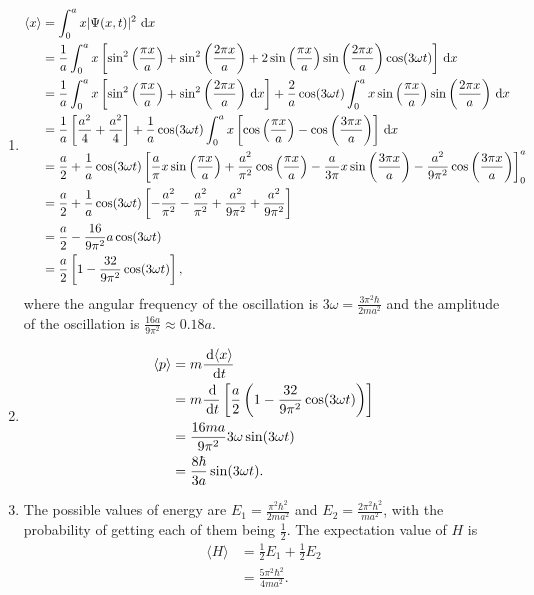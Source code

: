 \documentclass[en, oneside]{vivi}
\begin{document}
\begin{sol}
\begin{enumerate} [label=(\alph*)]
\begin{align*}
        \end{align*}
        \item \begin{align*}
            \langle x \rangle &= \int_{0}^{a}x|\Psi(x, t)|^2 \dif x\\
            &= \frac{1}{a} \int_{0}^{a}x \left[\sin^2\left(\frac{\pi x}{a}\right) + \sin^2\left(\frac{2\pi x}{a}\right) + 2 \sin\left(\frac{\pi x}{a}\right)\sin\left(\frac{2\pi x}{a}\right) \cos(3\omega t)\right] \dif x\\
            &= \frac{1}{a} \int_{0}^{a}x \left[\sin^2\left(\frac{\pi x}{a}\right) + \sin^2\left(\frac{2\pi x}{a}\right) \dif x \right] + \frac{2}{a} \cos(3\omega t) \int_{0}^{a}x \sin\left(\frac{\pi x}{a}\right)\sin\left(\frac{2\pi x}{a}\right) \dif x\\
            &= \frac{1}{a} \left[\frac{a^2}{4} + \frac{a^2}{4}\right] + \frac{1}{a} \cos(3\omega t) \int_{0}^{a}x \left[ \cos\left(\frac{\pi x}{a}\right) - \cos\left(\frac{3\pi x}{a}\right) \right] \dif x\\
            &= \frac{a}{2} + \frac{1}{a} \cos(3\omega t) \left[ \frac{a}{\pi} x \sin\left(\frac{\pi x}{a}\right) + \frac{a^2}{\pi^2} \cos\left(\frac{\pi x}{a}\right) - \frac{a}{3\pi} x \sin\left(\frac{3\pi x}{a}\right) - \frac{a^2}{9\pi^2} \cos\left(\frac{3\pi x}{a}\right) \right]_0^a\\
            &= \frac{a}{2} + \frac{1}{a} \cos(3\omega t) \left[ - \frac{a^2}{\pi^2} - \frac{a^2}{\pi^2} + \frac{a^2}{9\pi^2} + \frac{a^2}{9\pi^2} \right]\\
            &= \frac{a}{2} - \frac{16}{9\pi^2} a \cos(3\omega t)\\
            &= \frac{a}{2} \left[ 1 - \frac{32}{9\pi^2} \cos(3\omega t) \right],
        \end{align*}
        where the angular frequency of the oscillation is $3\omega = \frac{3\pi^2 \hbar}{2ma^2}$ and the amplitude of the oscillation is $\frac{16 a}{9\pi^2} \approx 0.18 a$.
        \item \begin{align*}
            \langle p \rangle &= m \frac{\dif \langle x \rangle}{\dif t}\\
            &= m \frac{\dif}{\dif t} \left[ \frac{a}{2} \left( 1 - \frac{32}{9\pi^2} \cos(3\omega t) \right) \right]\\
            &= \frac{16 m a}{9\pi^2} 3\omega \sin(3\omega t)\\
            &= \frac{8 \hbar}{3a} \sin(3\omega t).
        \end{align*}
        \item The possible values of energy are $E_1 = \frac{\pi^2 \hbar^2}{2ma^2}$ and $E_2 = \frac{2\pi^2 \hbar^2}{ma^2}$, with the probability of getting each of them being $\frac{1}{2}$. The expectation value of $H$ is
        \begin{align*}
            \langle H \rangle &= \frac{1}{2} E_1 + \frac{1}{2} E_2\\
            &= \frac{5\pi^2 \hbar^2}{4ma^2}.
        \end{align*}
    \end{enumerate}
\end{sol}
\end{document}

